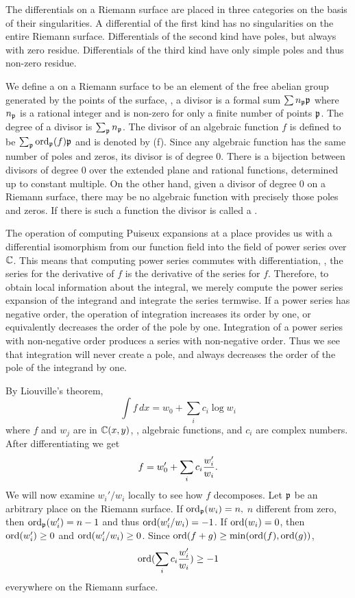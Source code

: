 The differentials on a Riemann surface are placed in
three categories on the basis of their singularities.  A
differential of the first kind has no singularities on the
entire Riemann surface.  Differentials of the second kind 
have poles, but always with zero residue.  Differentials of
the third kind have only simple poles and thus non-zero
residue.

We define a  on a Riemann surface to be an element of
the free abelian group generated by the points of the surface, \ie, a
divisor is a formal sum $\sum n_{{\mathfrak p}}{\mathfrak p}$ where $n_{{\mathfrak p}}$ is a
rational integer and is non-zero for only a finite number of points
${\mathfrak p}$.  The degree of a divisor is $\sum_{{\mathfrak p}} n_{{\mathfrak p}}$. The
divisor of an algebraic function $f$ is defined to be $\sum_{{\mathfrak p}}
\mathop{\rm ord}\nolimits_{{\mathfrak p}}(f){\mathfrak p}$ and is denoted by (f).  Since any algebraic
function has the same number of poles and zeros, its divisor is of
degree 0.  There is a bijection between divisors of degree 0 over the
extended plane and rational functions, determined up to constant
multiple.  On the other hand, given a divisor of degree 0 on a Riemann
surface, there may be no algebraic function with precisely those poles
and zeros.  If there is such a function the divisor is called a
.

The operation of computing Puiseux expansions at a place provides us
with a differential isomorphism from our function field into the field
of power series over $\mathbb{C}$.  This means that computing power series
commutes with differentiation, \ie, the series for the derivative of
$f$ is the derivative of the series for $f$.  Therefore, to obtain
local information about the integral, we merely compute the power
series expansion of the integrand and integrate the series termwise.
If a power series has negative order, the operation of integration
increases its order by one, or equivalently decreases the order of the
pole by one.  Integration of a power series with non-negative order
produces a series with non-negative order.  Thus we see that
integration will never create a pole, and always decreases the order
of the pole of the integrand by one.

By Liouville's theorem,
\[
\int f\,dx = w_0 + \sum_i c_i \log w_i
\]
where $f$ and  $w_j$ are in $\mathbb{C}(x,y)$, \ie, algebraic functions, and
$c_i$ are complex numbers.
After differentiating we get 
\[
f= w_0' + \sum_i c_i {w_i' \over w_i}.
\]
We
will now examine $w_i'/w_i$ locally to see how $f$ decomposes.  Let
${\mathfrak p}$ be an arbitrary place on the Riemann surface.  If 
$\mathop{\rm ord}\nolimits_{{\mathfrak p}}(w_i) = n,$
$n$ different from zero,
then $\mathop{\rm ord}\nolimits_{{\mathfrak p}}(w_i') = n-1$ and thus
$\mathop{\rm ord}\nolimits(w_i'/w_i) = -1$.
If $\mathop{\rm ord}\nolimits(w_i) = 0$, then
$\mathop{\rm ord}\nolimits(w_i') \ge 0$ and $\mathop{\rm ord}\nolimits(w_i'/w_i) \ge 0$.
Since $\mathop{\rm ord}\nolimits(f+g) \ge \min(\mathop{\rm ord}\nolimits(f),\mathop{\rm ord}\nolimits(g))$, 
\[
\mathop{\rm ord}\nolimits(\sum_i c_i {w_i' \over w_i}) \ge -1
\]
everywhere on the Riemann surface.

